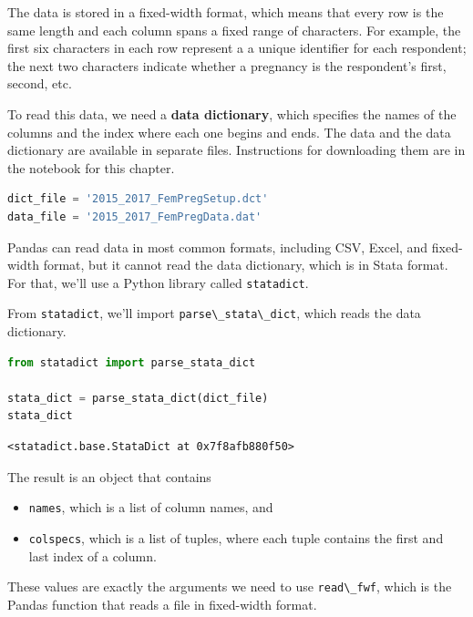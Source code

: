 \documentclass[
]{book}
\newcommand{\passthrough}[1]{#1}
\begin{document}
The data is stored in a fixed-width format, which means that every row
is the same length and each column spans a fixed range of characters.
For example, the first six characters in each row represent a a unique
identifier for each respondent; the next two characters indicate whether
a pregnancy is the respondent's first, second, etc.

To read this data, we need a \textbf{data dictionary}, which specifies
the names of the columns and the index where each one begins and ends.
The data and the data dictionary are available in separate files.
Instructions for downloading them are in the notebook for this chapter.

\begin{lstlisting}[language=Python]
dict_file = '2015_2017_FemPregSetup.dct'
data_file = '2015_2017_FemPregData.dat'
\end{lstlisting}

Pandas can read data in most common formats, including CSV, Excel, and
fixed-width format, but it cannot read the data dictionary, which is in
Stata format. For that, we'll use a Python library called
\passthrough{\lstinline!statadict!}.

From \passthrough{\lstinline!statadict!}, we'll import
\passthrough{\lstinline!parse\_stata\_dict!}, which reads the data
dictionary.

\begin{lstlisting}[language=Python]
from statadict import parse_stata_dict

stata_dict = parse_stata_dict(dict_file)
stata_dict
\end{lstlisting}

\begin{lstlisting}
<statadict.base.StataDict at 0x7f8afb880f50>
\end{lstlisting}

The result is an object that contains

\begin{itemize}
\item
  \passthrough{\lstinline!names!}, which is a list of column names, and
\item
  \passthrough{\lstinline!colspecs!}, which is a list of tuples, where
  each tuple contains the first and last index of a column.
\end{itemize}

These values are exactly the arguments we need to use
\passthrough{\lstinline!read\_fwf!}, which is the Pandas function that
reads a file in fixed-width format.
\end{document}
